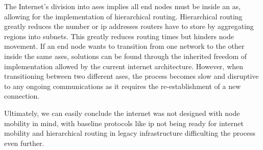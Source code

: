 
The Internet’s division into \gls{as}es implies all end nodes must be inside an \gls{as}, allowing for the implementation of hierarchical routing. Hierarchical routing greatly reduces the number or \gls{ip} addresses routers have to store by aggregating regions into subnets. This greatly reduces routing times but hinders node movement.
If an end node wants to transition from one network to the other inside the same \gls{as}es, solutions can be found through the inherited freedom of implementation allowed by the current internet architecture. However, when transitioning between two different \gls{as}es, the process becomes slow and disruptive to any ongoing communications as it requires the re-establishment of a new connection.

Ultimately, we can easily conclude the internet was not designed with node mobility in mind, with baseline protocols like \gls{ip} not being ready for internet mobility and hierarchical routing in legacy infrastructure difficulting the process even further.


